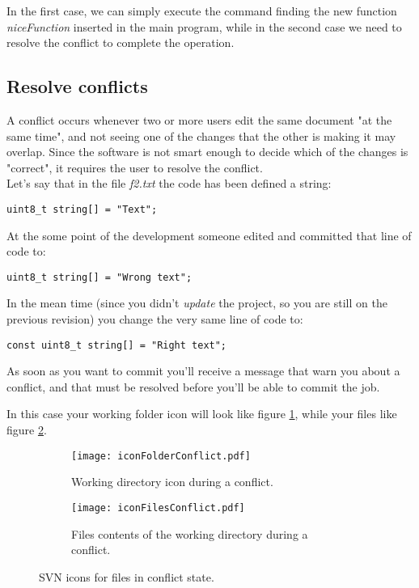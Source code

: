 In the first case, we can simply execute the command finding the new function \textit{niceFunction} inserted in the main program, while in the second case we need to resolve the conflict to complete the operation.\\


\subsection{Resolve conflicts}
\label{subsection:ResolveConflicts}


A conflict occurs whenever two or more users edit the same document "at the same time", and not seeing one of the changes that the other is making it may overlap. Since the software is not smart enough to decide which of the changes is "correct", it requires the user to resolve the conflict.\\

Let's say that in the file \textit{f2.txt} the code has been defined a string: \begin{verbatim}uint8_t string[] = "Text";\end{verbatim}

At the some point of the development someone edited and committed that line of code to:

\begin{verbatim}uint8_t string[] = "Wrong text";\end{verbatim}

In the mean time (since you didn't \textit{update} the project, so you are still on the previous revision) you change the very same line of code to:

\begin{verbatim}const uint8_t string[] = "Right text";\end{verbatim}

As soon as you want to commit you'll receive a message that warn you about a conflict, and that must be resolved before you'll be able to commit the job.

In this case your working folder icon will look like figure \ref{fig:iconFolderConflict}, while your files like figure \ref{fig:iconFileConflict}.\\


\begin{figure}[htbp]
\begin{subfigure}{0.5\textwidth}
  \centering
  \texttt{[image: iconFolderConflict.pdf]}
  \caption{Working directory icon during a conflict.}
  \label{fig:iconFolderConflict}
\end{subfigure}%
\begin{subfigure}{0.5\textwidth}
  \centering
  \texttt{[image: iconFilesConflict.pdf]}
  \caption{Files contents of the working directory during a conflict.}
  \label{fig:iconFileConflict}
\end{subfigure}
\caption{SVN icons for files in conflict state.}
\label{fig:systemIcons_4}
\end{figure}

